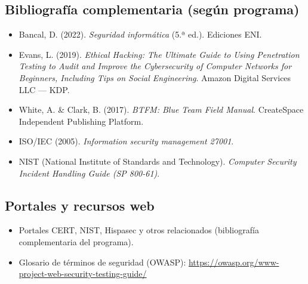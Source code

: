 \documentclass[11pt,a4paper]{article}
\begin{document}
\subsection{Bibliografía complementaria (según programa)}
\begin{itemize}[leftmargin=*]
  \item Bancal, D. (2022). \textit{Seguridad informática} (5.ª ed.). Ediciones ENI.
  \item Evans, L. (2019). \textit{Ethical Hacking: The Ultimate Guide to Using Penetration Testing to Audit and Improve the Cybersecurity of Computer Networks for Beginners, Including Tips on Social Engineering}. Amazon Digital Services LLC --- KDP.
  \item White, A. \& Clark, B. (2017). \textit{BTFM: Blue Team Field Manual}. CreateSpace Independent Publishing Platform.
  \item ISO/IEC (2005). \textit{Information security management 27001}.
  \item NIST (National Institute of Standards and Technology). \textit{Computer Security Incident Handling Guide (SP 800-61)}.
\end{itemize}

\subsection{Portales y recursos web}
\begin{itemize}[leftmargin=*]
  \item Portales CERT, NIST, Hispasec y otros relacionados (bibliografía complementaria del programa).
  \item Glosario de términos de seguridad (OWASP): \url{https://owasp.org/www-project-web-security-testing-guide/}
\end{itemize}
\end{document}
